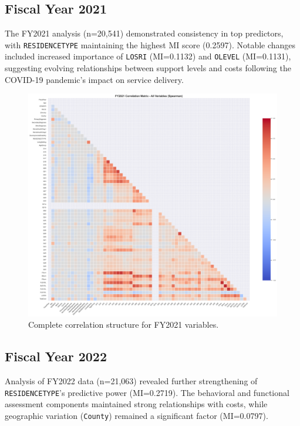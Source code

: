 \newpage

\subsection{Fiscal Year 2021}
\label{subsec:fy2021}

The FY2021 analysis (n=20,541) demonstrated consistency in top predictors, with \texttt{RESIDENCETYPE} maintaining the highest MI score (0.2597). Notable changes included increased importance of \texttt{LOSRI} (MI=0.1132) and \texttt{OLEVEL} (MI=0.1131), suggesting evolving relationships between support levels and costs following the COVID-19 pandemic's impact on service delivery.

\begin{figure}[htbp]
    \centering
    \includegraphics[width=\textwidth]{figures/fy2021_correlation_matrix_-_all_variables_(spearman).png}
    \caption{Complete correlation structure for FY2021 variables.}
    \label{fig:fy2021-corr-all}
\end{figure}

\newpage

\subsection{Fiscal Year 2022}
\label{subsec:fy2022}

Analysis of FY2022 data (n=21,063) revealed further strengthening of \texttt{RESIDENCETYPE}'s predictive power (MI=0.2719). The behavioral and functional assessment components maintained strong relationships with costs, while geographic variation (\texttt{County}) remained a significant factor (MI=0.0797).

